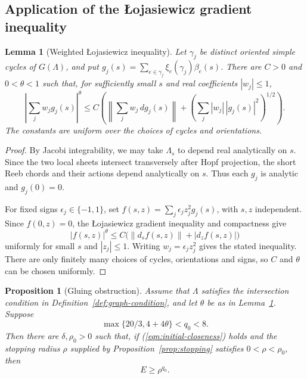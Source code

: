 \documentclass[11pt,a4paper]{article}
\numberwithin{equation}{section}
\newtheorem{proposition}[theorem]{Proposition}
\newtheorem{lemma}[theorem]{Lemma}
\theoremstyle{definition}
\theoremstyle{remark}
\begin{document}
	\subsection{Application of the \L{}ojasiewicz gradient inequality}
	\label{sect:noncancellation}
	
	\begin{lemma}[Weighted \L{}ojasiewicz inequality]
		\label{lem:weighted-action-lojasiewicz}
		Let $\gamma_j$ be distinct oriented simple cycles of $G(\Lambda)$, and put
		$g_j(s)=\sum_{e\in \gamma_j}\xi_e(\gamma_j)\beta_e(s)$.
		There are $C>0$ and $0<\theta<1$ such that,
		for sufficiently small $s$ and real coefficients $|w_j|\le1$,
		\[
		\left|\sum_jw_jg_j(s)\right|^\theta
		\le C\left(
		\left\|\sum_jw_j\,dg_j(s)\right\|
		+\left(\sum_j|w_j|\,|g_j(s)|^2\right)^{1/2}\right).
		\]
		The constants are uniform over the choices of cycles and orientations.
	\end{lemma}
	
	\begin{proof}
		By Jacobi integrability, we may take $\Lambda_s$ to depend real
		analytically on $s$.
		Since the two local sheets intersect transversely after Hopf projection,
		the short Reeb chords and their actions depend analytically on $s$. Thus each $g_j$ is analytic
		and $g_j(0)=0$.
		
		For fixed signs $\epsilon_j\in\{-1,1\}$, set
		$f(s,z)=\sum_j\epsilon_j z_j^2g_j(s)$, with $s,z$ independent.
		Since $f(0,z)=0$, the \L{}ojasiewicz gradient inequality and compactness give
		\[
		|f(s,z)|^\theta\le C\bigl(\|d_sf(s,z)\|+|d_zf(s,z)|\bigr)
		\]
		uniformly for small $s$ and $|z_j|\le1$.
		Writing $w_j=\epsilon_j z_j^2$ gives the stated inequality.
		There are only finitely many choices of cycles, orientations and signs,
		so $C$ and $\theta$ can be chosen uniformly.
	\end{proof}
	
	\begin{proposition}[Gluing obstruction]\label{prop:assembly}
		Assume that $\Lambda$ satisfies the intersection condition in
		Definition~\ref{def:graph-condition}, and let $\theta$ be as in
		Lemma~\ref{lem:weighted-action-lojasiewicz}. Suppose
		\[
		\max\{20/3,4+4\theta\}<q_0<8.
		\]
		Then there are $\delta,\rho_0>0$ such that, if
		(\ref{eqn:initial-closeness}) holds and the stopping radius
		$\rho$ supplied by Proposition~\ref{prop:stopping} satisfies
		$0<\rho<\rho_0$, then
		\begin{equation}\label{eqn:gluing-obstruction}
			E\ge\rho^{q_0}.
		\end{equation}
	\end{proposition}
	
\end{document}

